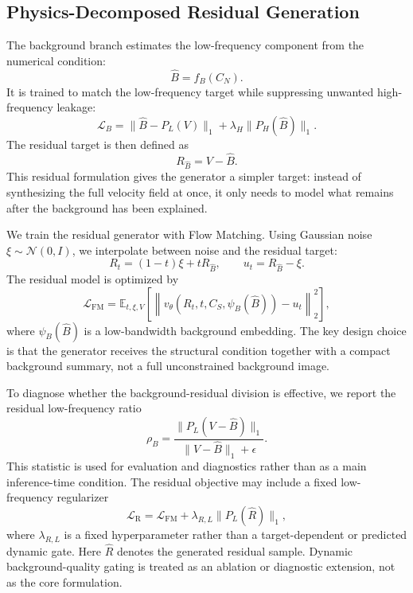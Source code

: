 \documentclass[letterpaper]{article}
\begin{document}
\subsection{Physics-Decomposed Residual Generation}
The background branch estimates the low-frequency component from the numerical condition:
\begin{equation}
\hat B=f_B(C_N).
\end{equation}
It is trained to match the low-frequency target while suppressing unwanted high-frequency leakage:
\begin{equation}
\mathcal L_B=\|\hat B-P_L(V)\|_1+\lambda_H\|P_H(\hat B)\|_1.
\end{equation}
The residual target is then defined as
\begin{equation}
R_{\hat B}=V-\hat B.
\end{equation}
This residual formulation gives the generator a simpler target: instead of synthesizing the full velocity field at once, it only needs to model what remains after the background has been explained.

We train the residual generator with Flow Matching. Using Gaussian noise $\xi\sim\mathcal N(0,I)$, we interpolate between noise and the residual target:
\begin{equation}
R_t=(1-t)\xi+tR_{\hat B},
\qquad
u_t=R_{\hat B}-\xi.
\end{equation}
The residual model is optimized by
\begin{equation}
\mathcal L_{\mathrm{FM}}
=
\mathbb E_{t,\xi,V}
\left[
\left\|
v_\theta(R_t,t,C_S,\psi_B(\hat B))-u_t
\right\|_2^2
\right],
\end{equation}
where $\psi_B(\hat B)$ is a low-bandwidth background embedding. The key design choice is that the generator receives the structural condition together with a compact background summary, not a full unconstrained background image.

To diagnose whether the background-residual division is effective, we report the residual low-frequency ratio
\begin{equation}
\rho_B=
\frac{\|P_L(V-\hat B)\|_1}{\|V-\hat B\|_1+\epsilon}.
\end{equation}
This statistic is used for evaluation and diagnostics rather than as a main inference-time condition. The residual objective may include a fixed low-frequency regularizer
\begin{equation}
\mathcal L_{\mathrm{R}}
=
\mathcal L_{\mathrm{FM}}
+\lambda_{R,L}\|P_L(\hat R)\|_1,
\end{equation}
where $\lambda_{R,L}$ is a fixed hyperparameter rather than a target-dependent or predicted dynamic gate. Here $\hat R$ denotes the generated residual sample. Dynamic background-quality gating is treated as an ablation or diagnostic extension, not as the core formulation.
\end{document}
